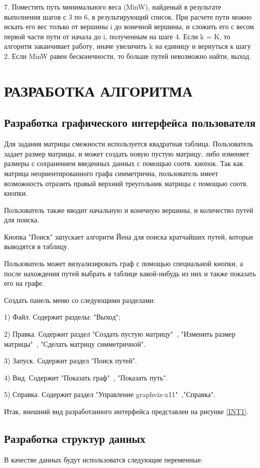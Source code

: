 7. Поместить путь минимального веса (MinW), найденый в результате выполнения шагов с 3 по 6, в результирующий список. При расчете пути можно искать его вес только от вершины i до конечной вершины, и сложить его с весом первой части пути от начала до i, полученным на шаге 4. Если k = K, то алгоритм заканчивает работу, иначе увеличить k на единицу и вернуться к шагу 2. Если MinW равен бесконечности, то больше путей невозможно найти, выход.
\section{РАЗРАБОТКА АЛГОРИТМА}
\subsection{Разработка графического интерфейса пользователя}
Для задания матрицы смежности используется квадратная таблица. Пользователь задает размер матрицы, и может создать новую пустую матрицу, либо изменяет размеры с сохранением введенных данных с помощью соотв. кнопок. Так как матрица неориентированного графа симметрична, пользователь имеет возможность отразить правый верхний треугольник матрицы с помощью соотв. кнопки.

Пользователь также вводит начальную и конечную вершины, и количество путей для поиска. 

Кнопка "Поиск" запускает алгоритм Йена для поиска кратчайших путей, которые выводятся в таблицу.

Пользователь может визуализировать граф с помощью специальной кнопки, а после нахождения путей выбрать в таблице какой-нибудь из них и также показать его на графе.

Создать панель меню со следующими разделами:

1)	Файл. Содержит разделы: "Выход";

2)	Правка. Содержит раздел "Создать пустую матрицу"\ , "Изменить размер матрицы"\ , "Сделать матрицу симметричной".

3)	Запуск. Содержит раздел "Поиск путей".

4)  Вид. Содержит "Показать граф"\ , "Показать путь".

5)  Справка. Содержит раздел "Управление graphviz-x11"\ ,"Справка".

Итак, внешний вид разработанного интерфейса представлен на рисунке \ref{INT1}.
\subsection{Разработка структур данных}
В качестве данных будут использоватся следующие переменные:

